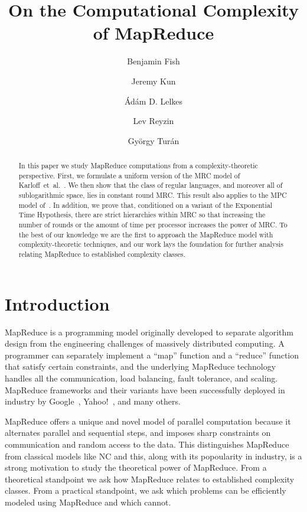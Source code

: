 \documentclass[letterpaper,USenglish]{lipics}
\title{On the Computational Complexity of MapReduce
}
\date{}
\author{Benjamin Fish}
\author{Jeremy Kun}
\author{\'Ad\'am D. Lelkes}
\author{Lev Reyzin}
\author{Gy\"orgy Tur\'an}
\affil{
Department of Mathematics, Statistics, and Computer Science\\
University of Illinois at Chicago\\
Chicago, IL 60607\\
\texttt{\{bfish3,jkun2,alelke2,lreyzin,gyt\}@uic.edu}
}
\theoremstyle{definition}
\theoremstyle{remark}
\begin{document}
\maketitle

\begin{abstract} In this paper we study MapReduce computations from a
complexity-theoretic perspective. First, we formulate a uniform version of
the MRC model of Karloff~et~al.~\cite{Karloff10}. We then show that the class
of regular languages, and moreover all of sublogarithmic space, lies in
constant round MRC. This result also applies to the MPC model
of~\cite{AndoniNOY14}. In addition, we prove that, conditioned on a variant of
the Exponential Time Hypothesis, there are strict hierarchies within MRC so
that increasing the number of rounds or the amount of time per processor
increases the power of MRC. To the best of our knowledge we are the first to
approach the MapReduce model with complexity-theoretic techniques, and our work
lays the foundation for further analysis relating MapReduce to established
complexity classes. \end{abstract}

\section{Introduction}

MapReduce is a programming model originally developed to separate algorithm
design from the engineering challenges of massively distributed computing. A
programmer can separately implement a ``map'' function and a ``reduce''
function that satisfy certain constraints, and the underlying MapReduce
technology handles all the communication, load balancing, fault tolerance, and
scaling. MapReduce frameworks and their variants have been successfully
deployed in industry by Google~\cite{DeanG08}, Yahoo!~\cite{ShvachkoKRC10}, and
many others.

MapReduce offers a unique and novel model of parallel computation because it
alternates parallel and sequential steps, and imposes sharp constraints on
communication and random access to the data. This distinguishes MapReduce from
classical models like NC and this, along with its popoularity in industry, is a
strong motivation to study the theoretical power of MapReduce. From a
theoretical standpoint we ask how MapReduce relates to established complexity
classes. From a practical standpoint, we ask which problems can be efficiently
modeled using MapReduce and which cannot.
\end{document}
